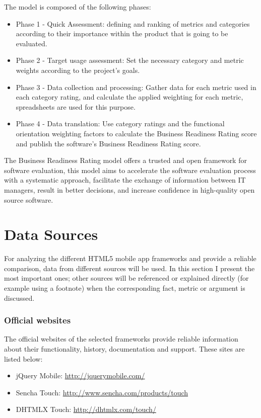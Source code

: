 \documentclass[a4paper,12pt]{book}
\begin{document}
The model is composed of the following phases:
\begin{itemize}
\item Phase 1 - Quick Assessment: defining and ranking of metrics and categories
according to their importance within the product that is going to be evaluated.
\item Phase 2 - Target usage assessment: Set the necessary category and metric
weights according to the project's goals.
\item Phase 3 - Data collection and processing: Gather data for each metric used
in each category rating, and calculate the applied weighting for each metric,
spreadsheets are used for this purpose.
\item Phase 4 - Data translation: Use category ratings and the functional
orientation weighting factors to calculate the Business Readiness Rating score
and publish the software’s Business Readiness Rating score.
\end{itemize}

The Business Readiness Rating model offers a trusted and open framework for
software evaluation, this model aims to accelerate the software evaluation
process with a systematic approach, facilitate the exchange of information
between IT managers, result in better decisions, and increase confidence in
high-quality open source software.

\section{Data Sources}
\label{sec:data}

For analyzing the different HTML5 mobile app frameworks and
provide a reliable comparison, data from different sources will be used. In
this section I present the most important ones; other sources will be
referenced or explained directly (for example using a footnote) when the
corresponding fact, metric or argument is discussed.

\subsubsection{Official websites}
The official websites of the selected frameworks provide reliable information about their functionality, history, documentation and support. These sites are listed below:
\begin{itemize}
 \item jQuery Mobile: \url{http://jquerymobile.com/}
 \item Sencha Touch: \url{http://www.sencha.com/products/touch}
 \item DHTMLX Touch: \url{http://dhtmlx.com/touch/}
\end{itemize}
\end{document}

